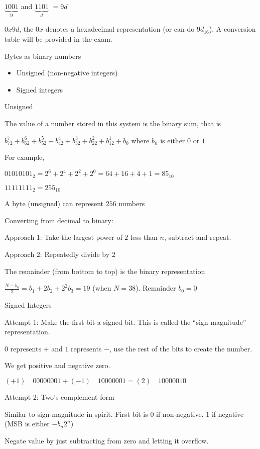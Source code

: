 \documentclass{article}
\begin{document}
\(\underbrace{1001}_{9}\) and \(\underbrace{1101}_{d}\) \(= 9d\)

\(0x9d\), the \(0x\) denotes a hexadecimal representation (or can do
\(9d_{16}\)). A conversion table will be provided in the exam.

Bytes as binary numbers
\begin{itemize}
    \item Unsigned (non-negative integers)
    \item Signed integers
\end{itemize}

Unsigned

The value of a number stored in this system is the binary sum, that is

\(b_72^7 + b_62^6 + b_52^5 + b_42^4 + b_32^3 + b_22^2 + b_12^1 + b_0\)
where \(b_n\) is either \(0\) or \(1\)

For example,

\(01010101_2 = 2^6 + 2^4 + 2^2 + 2^0 = 64 + 16 + 4 + 1 = 85_{10}\)

\(11111111_2 = 255_{10}\)

A byte (unsigned) can represent \(256\) numbers

Converting from decimal to binary:

Approach 1: Take the largest power of \(2\) less than \(n\), subtract
and repeat.

Approach 2: Repeatedly divide by \(2\)

The remainder (from bottom to top) is the binary representation

\(\frac{N - b_0}{2} = b_1+ 2b_2 +2^2b_3 = 19\) (when \(N = 38\)).
Remainder \(b_0 = 0\)

Signed Integers


Attempt 1: Make the first bit a signed bit. This is called the
``sign-magnitude'' representation.

\(0\) represents \(+\) and \(1\) represents \(-\), use the rest of the
bits to create the number.

We get positive and negative zero.

\((+1) \quad 0000 0001 + (-1) \quad 1000 0001 =  (2) \quad 1000 0010\)

Attempt 2: Two's complement form

Similar to sign-magnitude in spirit. First bit is \(0\) if non-negative,
\(1\) if negative (MSB is either \(-b_n2^n\))

Negate value by just subtracting from zero and letting it overflow.
\end{document}
